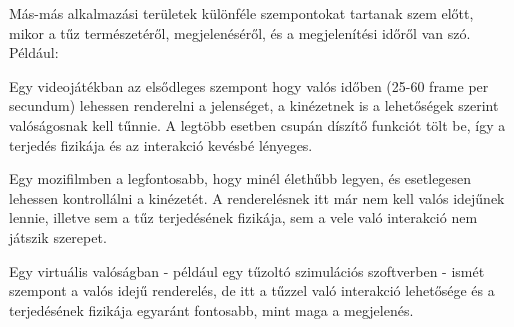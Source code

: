 Más-más alkalmazási területek különféle szempontokat tartanak szem előtt, mikor a tűz természetéről, megjelenéséről, és a megjelenítési időről van szó. Például:

Egy videojátékban az elsődleges szempont hogy valós időben (25-60 frame per secundum) lehessen renderelni a jelenséget, a kinézetnek is a lehetőségek szerint valóságosnak kell tűnnie. A legtöbb esetben csupán díszítő funkciót tölt be, így a terjedés fizikája és az interakció kevésbé lényeges.

Egy mozifilmben a legfontosabb, hogy minél élethűbb legyen, és esetlegesen lehessen kontrollálni a kinézetét. A renderelésnek itt már nem kell valós idejűnek lennie, illetve sem a tűz terjedésének fizikája, sem a vele való interakció nem játszik szerepet.

Egy virtuális valóságban - például egy tűzoltó szimulációs szoftverben - ismét szempont a valós idejű renderelés, de itt a tűzzel való interakció lehetősége és a terjedésének fizikája egyaránt fontosabb, mint maga a megjelenés.
